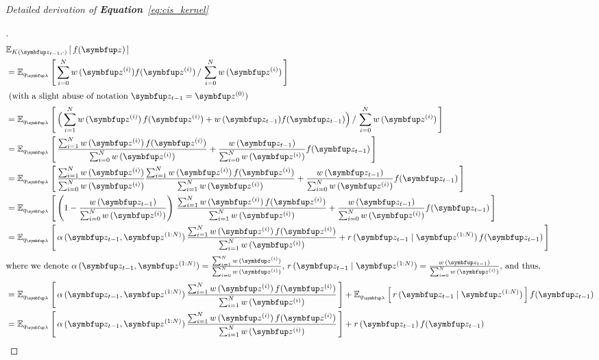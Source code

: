 

\textit{Detailed derivation of \textbf{Equation}~\eqref{eq:cis_kernel}}
\begin{proof}[\unskip\nopunct]
\begin{align}
  &\Esub{K(\vz_{t-1}, \cdot)}{f(\vz)} \\
  &= \Esub{q_{\vlambda}}{
      \sum^{N}_{i=0} w\,(\vz^{(i)}) f(\vz^{(i)}) 
      \,/\,
      \sum^{N}_{i=0} w\,(\vz^{(i)})
  } \\
  \intertext{
    (with a slight abuse of notation \(\vz_{t-1} = \vz^{(0)}\))
  }
  &= \Esub{q_{\vlambda}}{
    \Big(
    \sum^{N}_{i=1} w\,(\vz^{(i)})\,f(\vz^{(i)}) + w\,(\vz_{t-1}) f(\vz_{t-1})
    \Big)
      \,/\,
      \sum^{N}_{i=0} w\,(\vz^{(i)})
  } \\
  &= \Esub{q_{\vlambda}}{
    \frac{
      \sum^{N}_{i=1} w\,(\vz^{(i)})\,f(\vz^{(i)})
    }
    {
      \sum^{N}_{i=0} w\,(\vz^{(i)})
    }
    +
    \frac{w\,(\vz_{t-1})}{\sum^{N}_{i=0} w\,(\vz^{(i)})} f(\vz_{t-1})
  } \\
  &= \Esub{q_{\vlambda}}{
    \frac{
      \sum^{N}_{i=1} w\,(\vz^{(i)})  
    }
    {
      \sum^{N}_{i=0} w\,(\vz^{(i)})  
    }
    \frac{
      \sum^{N}_{i=1} w\,(\vz^{(i)})\,f(\vz^{(i)})
    }
    {
      \sum^{N}_{i=1} w\,(\vz^{(i)})
    }
    +
    \frac{w\,(\vz_{t-1})}{\sum^{N}_{i=0} w\,(\vz^{(i)})} f(\vz_{t-1})
  } \\
  &= \Esub{q_{\vlambda}}{
    \left(
    1 - \frac{
       w\,(\vz_{t-1}) 
    }
    {
      \sum^{N}_{i=0} w\,(\vz^{(i)})  
    }
    \right)\,
    \frac{
      \sum^{N}_{i=1} w\,(\vz^{(i)})\,f(\vz^{(i)})
    }
    {
      \sum^{N}_{i=1} w\,(\vz^{(i)})
    }
    +
    \frac{w\,(\vz_{t-1})}{\sum^{N}_{i=0} w\,(\vz^{(i)})} f(\vz_{t-1})
  } \\
  &= \Esub{q_{\vlambda}}{
    \alpha\,(\vz_{t-1}, \vz^{(1:N)}) \,
    \frac{
      \sum^{N}_{i=1} w\,(\vz^{(i)})\,f(\vz^{(i)})
    }
    {
      \sum^{N}_{i=1} w\,(\vz^{(i)})
    }
    +
    r\,(\vz_{t-1}\mid\vz^{(1:N)}) \, f(\vz_{t-1})
  } \\ 
  \intertext{where we denote
    \(
    \alpha\,(\vz_{t-1}, \vz^{(1:N)}) =
    \frac{
      \sum^{N}_{i=1} w\,(\vz^{(i)})  
    }
    {
      \sum^{N}_{i=0} w\,(\vz^{(i)})  
    }
  \),
  \(
  r\,(\vz_{t-1}\mid\vz^{(1:N)}) = \frac{w\,(\vz_{t-1})}{\sum^{N}_{i=0} w\,(\vz^{(i)})}
  \), and thus,
  }
%
  &= \Esub{q_{\vlambda}}{
    \alpha\,(\vz_{t-1}, \vz^{(1:N)}) \,
    \frac{
      \sum^{N}_{i=1} w\,(\vz^{(i)})\,f(\vz^{(i)})
    }
    {
      \sum^{N}_{i=1} w\,(\vz^{(i)})
    }
  }
    +
 \Esub{q_{\vlambda}}{
   r\,(\vz_{t-1}\mid\vz^{(1:N)})
 } f(\vz_{t-1}) \\
%
  &= \Esub{q_{\vlambda}}{
    \alpha\,(\vz_{t-1}, \vz^{(1:N)}) \,
    \frac{
      \sum^{N}_{i=1} w\,(\vz^{(i)})\,f(\vz^{(i)})
    }
    {
      \sum^{N}_{i=1} w\,(\vz^{(i)})
    }
  }
    +
   r\,(\vz_{t-1})\,f(\vz_{t-1}) %
%
\end{align}
\end{proof}

